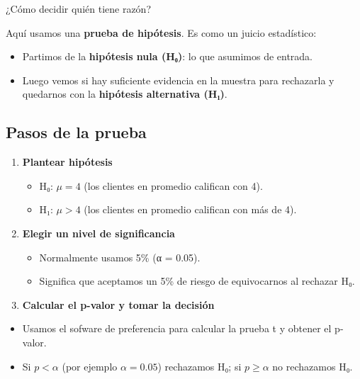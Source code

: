 \documentclass[
  spanish,
  letterpaper,
  DIV=11,
  numbers=noendperiod]{scrreprt}
\providecommand{\tightlist}{%
  \setlength{\itemsep}{0pt}\setlength{\parskip}{0pt}}
\begin{document}
¿Cómo decidir quién tiene razón?

Aquí usamos una \textbf{prueba de hipótesis}. Es como un juicio
estadístico:

\begin{itemize}
\tightlist
\item
  Partimos de la \textbf{hipótesis nula (H₀)}: lo que asumimos de
  entrada.\\
\item
  Luego vemos si hay suficiente evidencia en la muestra para rechazarla
  y quedarnos con la \textbf{hipótesis alternativa (H₁)}.
\end{itemize}

\subsection{Pasos de la prueba}\label{pasos-de-la-prueba}

\begin{enumerate}
\def\labelenumi{\arabic{enumi}.}
\tightlist
\item
  \textbf{Plantear hipótesis}

  \begin{itemize}
  \tightlist
  \item
    H₀: \(\mu = 4\) (los clientes en promedio califican con 4).\\
  \item
    H₁: \(\mu > 4\) (los clientes en promedio califican con más de 4).
  \end{itemize}
\item
  \textbf{Elegir un nivel de significancia}

  \begin{itemize}
  \tightlist
  \item
    Normalmente usamos 5\% (α = 0.05).\\
  \item
    Significa que aceptamos un 5\% de riesgo de equivocarnos al rechazar
    H₀.
  \end{itemize}
\item
  \textbf{Calcular el p-valor y tomar la decisión}
\end{enumerate}

\begin{itemize}
\tightlist
\item
  Usamos el sofware de preferencia para calcular la prueba t y obtener
  el p-valor.
\item
  Si \(p < \alpha\) (por ejemplo \(\alpha=0.05\)) rechazamos H₀; si
  \(p \ge \alpha\) no rechazamos H₀.
\end{itemize}
\end{document}
